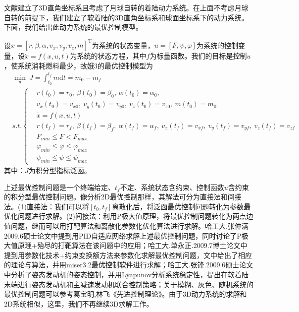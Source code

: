             \par
            文献\cite{Zhou}建立了3D直角坐标系且考虑了月球自转的着陆动力系统。在上面不考虑月球自转的前提下，我们建立了软着陆的3D直角坐标系和球面坐标系下的动力系统。下面，我们给出此动力系统的最优控制模型。
            \par
            设$x= [r,\beta,\alpha,v_x,v_y,v_z,m]^\mathrm{T}$为系统的状态变量，$u = [F,\psi,\varphi]$为系统的控制变量，设$\dot{x} = f(x,u,t)$为系统的状态方程，其中$f$为标量函数。我们的目标是控制$u$，使系统消耗燃料最少，故娥3的最优控制模型为
            \begin{align*}
            & \min_u \ J = \int_{t_0}^{t_f}\dot{m}\mathrm{d}t = m_0 - m_f\\
            & s.t.\left\{
            \begin{aligned}
            & r(t_0) = r_0,\ \beta(t_0) = \beta_0,\ \alpha(t_0) = \alpha_0,\\
            & v_x(t_0) = v_{x0},\ v_y(t_0) = v_{y0},\ v_z(t_0) = v_{z0},\ m(t_0) = m_0\\
            & \dot{x} = f(x,u,t)\\
            & r(t_f) = r_f,\ \beta(t_f) = \beta_f,\ \alpha(t_f) = \alpha_f,\ v_x(t_f) = v_{xf},\ v_y(t_f) = v_{yf},\ v_z(t_f) = v_{zf}\\
            & F_{min} \leqslant F <F_{max}\\
            & \varphi_{min} \leqslant \varphi \leqslant \varphi_{max}\\
            & \psi_{min} \leqslant \psi \leqslant \psi_{max}
            \end{aligned}
            \right.
            \end{align*}
            其中：$J$为积分型指标泛函。
            \par
            上述最优控制问题是一个终端给定、$t_f$不定、系统状态含约束、控制函数$u$含约束的积分型最优控制问题。像分析2D最优控制那样，其解法可分为直接法和间接法。(1)直接法：我们可以将$[t_0,t_f]$离散化后，将泛函最优控制问题转化为参数最优化问题进行求解。(2)间接法：利用P极大值原理，将最优控制问题转化为两点边值问题，继而可以用打靶算法和离散化参数化优化算法进行求解。哈工大.张仲满2009.6硕士论文中提到用PID自适应网络求解上述最优控制问题，同时讨论了P极大值原理+殆尽的打靶算法在该问题中的应用；哈工大.单永正.2009.7博士论文中提到用参数化技术+约束变换额方法来参数化求解最优控制问题，文中给出了相应的理论与算法，并用miser3.2最优控制软件进行求解；哈工大.张锋.2009.6硕士论文中分析了姿态发动机的姿态控制，并用Lyapunov分析系统稳定性，提出在软着陆末端进行姿态发动机和主减速发动机联合控制策略；关于模糊、灰色、随机系统的最优控制问题可以参考葛宝明,林飞《先进控制理论》。由于3D动力系统的求解和2D系统相似，这里，我们不再继续3D求解工作。
